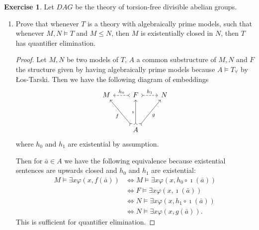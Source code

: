 \documentclass{article}
\theoremstyle{definition}
\newtheorem{question}{Exercise}
\begin{document}
\begin{question}
    Let \(DAG\) be the theory of torsion-free divisible abelian groups.

    \begin{enumerate}[(1)]
        \item Prove that whenever \(T\) is a theory with algebraically prime
              models, such that whenever \(M,N\models T\) and \(M\leq N\), then
              \(M\) is existentially closed in \(N\), then \(T\) has quantifier
              elimination.

              \begin{proof}
                  Let \(M,N\) be two models of \(T\), \(A\) a common
                  substructure of \(M,N\) and \(F\) the structure given by
                  having algebraically prime models because \(A\models
                  T_{\forall}\) by \L{}os-Tarski. Then we have the following
                  diagram of embeddings
                  \[
                      \begin{tikzcd}[ampersand replacement=\&]
                          M \& F \& N \\
                          \\
                          \& A
                          \arrow["f", from=3-2, to=1-1, tail]
                          \arrow["g"', from=3-2, to=1-3, tail]
                          \arrow["\imath", from=3-2, to=1-2, tail]
                          \arrow["h_{0}"', from=1-2, to=1-1, dashed, tail]
                          \arrow["h_{1}", from=1-2, to=1-3, dashed, tail]
                      \end{tikzcd}
                  \]
                  where \(h_{0}\) and \(h_{1}\) are existential by assumption.

                  Then for \(\bar{a}\in A\) we have the following equivalence
                  because existential sentences are upwards closed and \(h_{0}\)
                  and \(h_{1}\) are existential:
                  \begin{align*}
                      M\models\exists x\varphi(x,f(\bar{a})) & \Leftrightarrow M\models\exists x\varphi(x,h_{0}\circ\imath(\bar{a})) \\
                                                             & \Leftrightarrow F\models\exists x\varphi(x,\imath(\bar{a}))           \\
                                                             & \Leftrightarrow N\models\exists x\varphi(x,h_{1}\circ\imath(\bar{a})) \\
                                                             & \Leftrightarrow N\models\exists x\varphi(x,g(\bar{a})).
                  \end{align*}
                  This is sufficient for quantifier elimination.
              \end{proof}


\end{enumerate}
\end{question}
\end{document}
